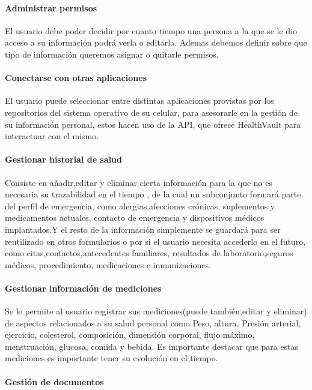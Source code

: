 \paragraph{Administrar permisos}

El usuario debe poder decidir por cuanto tiempo una persona a la que se le dio acceso a su información podrá verla o editarla. Ademas debemos definir sobre que tipo de información queremos asignar o quitarle permisos.

\paragraph{Conectarse con otras aplicaciones}

El usuario puede seleccionar entre distintas aplicaciones provistas por los repositorios del sistema operativo de su celular, para asesorarle en la gestión de su información personal, estos hacen uso de la API, que ofrece HealthVault para interactuar con el mismo.

\paragraph{Gestionar historial de salud}

Consiste en añadir,editar y eliminar cierta información para la que no es necesaria su trazabilidad en el tiempo , de la cual un subconjunto formará parte del perfil de emergencia, como alergias,afecciones crónicas, suplementos y medicamentos actuales, contacto de emergencia y dispositivos médicos implantados.Y el resto de la información simplemente se guardará para ser reutilizado en otros formularios o por si el usuario necesita accederlo en el futuro, como citas,contactos,antecedentes familiares, resultados de laboratorio,seguros médicos, procedimiento, medicaciones e inmunizaciones.
 
\paragraph{Gestionar información de mediciones}

Se le permite al usuario registrar sus mediciones(puede también,editar y eliminar) de aspectos relacionados a su salud personal como Peso, altura, Presión arterial, ejercicio, colesterol, composición, dimensión corporal, flujo máximo, menstruación, glucosa, comida y bebida. Es importante destacar que para estas mediciones es importante tener su evolución en el tiempo.

\paragraph{Gestión de documentos}

